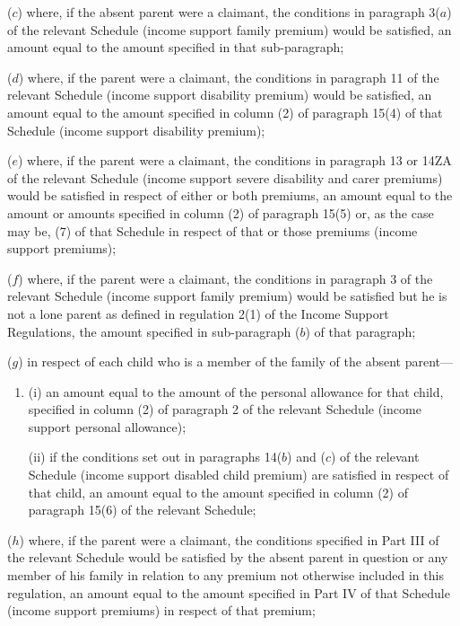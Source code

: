 \documentclass[12pt,a4paper]{article}
\begin{document}
\begin{enumerate}
($c$) where, if the absent parent were a claimant, the conditions in paragraph 3($a$) of the relevant Schedule (income support family premium) would be satisfied, an amount equal to the amount specified in that sub-paragraph;

($d$) where, if the parent were a claimant, the conditions in paragraph 11 of the relevant Schedule (income support disability premium) would be satisfied, an amount equal to the amount specified in column (2) of paragraph 15(4) of that Schedule (income support disability premium);

($e$) where, if the parent were a claimant, the conditions in paragraph 13 or 14ZA of the relevant Schedule (income support severe disability and carer premiums) would be satisfied in respect of either or both premiums, an amount equal to the amount or amounts specified in column (2) of paragraph 15(5) or, as the case may be, (7) of that Schedule in respect of that or those premiums (income support premiums);

($f$) where, if the parent were a claimant, the conditions in paragraph 3 of the relevant Schedule (income support family premium) would be satisfied 
but he is not a lone parent as defined in regulation 2(1) of the Income Support Regulations,  %
the amount specified in 
sub-paragraph ($b$) of  %
that paragraph;

($g$) in respect of each child who is a member of the family of the absent parent—
\begin{enumerate}\item[]
(i) an amount equal to the amount of the personal allowance for that child, specified in column (2) of paragraph 2 of the relevant Schedule (income support personal allowance);

(ii) if the conditions set out in paragraphs 14($b$) and ($c$) of the relevant Schedule (income support disabled child premium) are satisfied in respect of that child, an amount equal to the amount specified in column (2) of paragraph 15(6) of the relevant Schedule;
\end{enumerate}

($h$) where, if the parent were a claimant, the conditions specified in Part III of the relevant Schedule would be satisfied by the absent parent in question or any member of his family in relation to any premium not otherwise included in this regulation, an amount equal to the amount specified in Part IV of that Schedule (income support premiums) in respect of that premium;


\end{enumerate}
\end{document}
